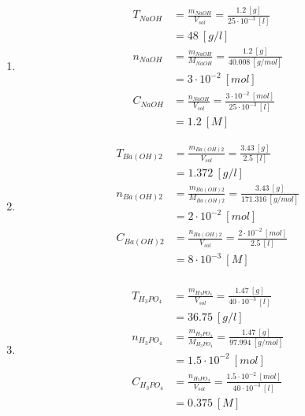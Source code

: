 \documentclass[
  11pt,
  french,
  a4paper,
  openany]{book}
\providecommand{\tightlist}{%
  \setlength{\itemsep}{0pt}\setlength{\parskip}{0pt}}
\begin{document}
\begin{Answer}

\begin{enumerate}
\def\labelenumi{\alph{enumi}.}
\tightlist
\item
  \[
  \begin{split}
    T_{NaOH} &= \frac{m_{NaOH}}{V_{sol}} = \frac{1.2\ [g]}{25 \cdot 10^{-3}\ [l]} \\
    &= 48\ [g/l] \\
    n_{NaOH} &= \frac{m_{NaOH}}{M_{NaOH}} = \frac{1.2\ [g]}{40.008\ [g/mol]} \\
    &= 3 \cdot 10^{-2}\ [mol] \\
    C_{NaOH} &= \frac{n_{NaOH}}{V_{sol}} = \frac{3 \cdot 10^{-2}\ [mol]}{25 \cdot 10^{-3}\ [l]} \\
    &= 1.2\ [M]
  \end{split}
  \]
\item
  \[
  \begin{split}
    T_{Ba(OH)2} &= \frac{m_{Ba(OH)2}}{V_{sol}} = \frac{3.43\ [g]}{2.5\ [l]} \\
    &= 1.372\ [g/l] \\
    n_{Ba(OH)2} &= \frac{m_{Ba(OH)2}}{M_{Ba(OH)2}} = \frac{3.43\ [g]}{171.316\ [g/mol]} \\
    &= 2 \cdot 10^{-2}\ [mol] \\
    C_{Ba(OH)2} &= \frac{n_{Ba(OH)2}}{V_{sol}} = \frac{2 \cdot 10^{-2}\ [mol]}{2.5\ [l]} \\
    &= 8 \cdot 10^{-3}\ [M] \\
  \end{split}
  \]
\item
  \[
  \begin{split}
    T_{H_3PO_4} &= \frac{m_{H_3PO_4}}{V_{sol}} = \frac{1.47\ [g]}{40 \cdot 10^{-3}\ [l]} \\
    &= 36.75\ [g/l] \\
    n_{H_3PO_4} &= \frac{m_{H_3PO_4}}{M_{H_3PO_4}} = \frac{1.47\ [g]}{97.994\ [g/mol]} \\
    &= 1.5 \cdot 10^{-2}\ [mol] \\
    C_{H_3PO_4} &= \frac{n_{H_3PO_4}}{V_{sol}} = \frac{1.5 \cdot 10^{-2}\ [mol]}{40 \cdot 10^{-3}\ [l]} \\
    &= 0.375\ [M] \\
  \end{split}
  \]
\end{enumerate}


\end{Answer}
\end{document}
